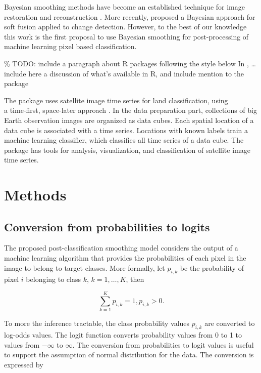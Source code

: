 \documentclass[
]{jss}
\begin{document}
Bayesian smoothing methods have become an established technique for image restoration and reconstruction \citep{Hanson1993}. More recently, \citet{Wu2017} proposed a Bayesian
approach for soft fusion applied to change detection. However, to the best of our knowledge
this work is the first proposal to use Bayesian smoothing for post-processing of machine
learning pixel based classification.

\% TODO: include a paragraph about R packages following the style below
In , \ldots include here a discussion of what's available in R, and
include mention to the  package

The  package uses satellite image time series for land classification, using\\
a time-first, space-later approach \cite{Simoes2021}. In the data preparation part,
collections of big Earth observation images are organized as data cubes.
Each spatial location of a data cube
is associated with a time series. Locations with known labels train a machine learning
classifier, which classifies all time series of a data cube. The package has tools for
analysis, visualization, and classification of satellite image time series.

\hypertarget{methods}{%
\section{Methods}\label{methods}}

\hypertarget{conversion-from-probabilities-to-logits}{%
\subsection{Conversion from probabilities to logits}\label{conversion-from-probabilities-to-logits}}

The proposed post-classification smoothing model considers the output of a machine
learning algorithm that provides the probabilities of each pixel in the image to belong
to target classes. More formally, let \(p_{i,k}\) be the probability of pixel
\(i\) belonging to class \(k\), \(k=1,\dots{},K\), then

\begin{equation}
\sum_{k=1}^K p_{i,k} = 1, p_{i,k} > 0.
\end{equation}

To more the inference tractable, the class probability values \(p_{i,k}\) are converted to
log-odds values. The logit function converts probability values from
0 to 1 to values from \(-\infty\) to \(\infty\). The conversion from probabilities to logit
values is useful to support the assumption of normal distribution for the data.
The conversion is expressed by
\end{document}
